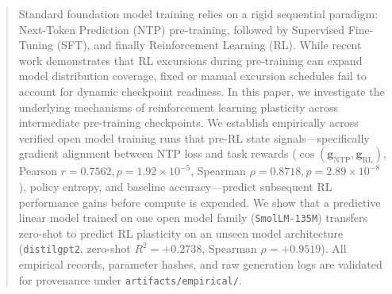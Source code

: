 \begin{abstract}
Standard foundation model training relies on a rigid sequential paradigm: Next-Token Prediction (NTP) pre-training, followed by Supervised Fine-Tuning (SFT), and finally Reinforcement Learning (RL). While recent work demonstrates that RL excursions during pre-training can expand model distribution coverage, fixed or manual excursion schedules fail to account for dynamic checkpoint readiness. In this paper, we investigate the underlying mechanisms of reinforcement learning plasticity across intermediate pre-training checkpoints. We establish empirically across verified open model training runs that pre-RL state signals—specifically gradient alignment between NTP loss and task rewards ($\cos(\mathbf{g}_{\text{NTP}}, \mathbf{g}_{\text{RL}})$, Pearson $r=0.7562, p=1.92\times 10^{-5}$, Spearman $\rho=0.8718, p=2.89\times 10^{-8}$), policy entropy, and baseline accuracy—predict subsequent RL performance gains before compute is expended. We show that a predictive linear model trained on one open model family (\texttt{SmolLM-135M}) transfers zero-shot to predict RL plasticity on an unseen model architecture (\texttt{distilgpt2}, zero-shot $R^2=+0.2738$, Spearman $\rho=+0.9519$). All empirical records, parameter hashes, and raw generation logs are validated for provenance under \texttt{artifacts/empirical/}.
\end{abstract}
